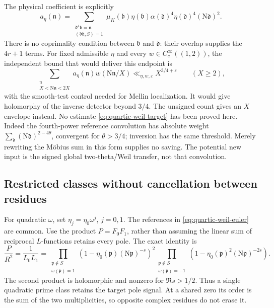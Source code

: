 \documentclass[11pt]{article}
\newcommand{\N}{\mathrm N}
\newcommand{\eps}{\varepsilon}
\begin{document}
The physical coefficient is explicitly
\[
 a_\eta(\mathfrak n)=
 \sum_{\substack{\mathfrak d^4\mathfrak b=\mathfrak n\\
                  (\mathfrak d\mathfrak b,S)=1}}
 \mu_K(\mathfrak b)\eta(\mathfrak b)
 \alpha(\mathfrak d)^4\eta(\mathfrak d)^4(\N\mathfrak d)^2.
\]
There is no coprimality condition between $\mathfrak b$ and
$\mathfrak d$: their overlap supplies the $4r+1$ terms.
For fixed admissible $\eta$ and every $w\in C_c^\infty((1,2))$, the
independent bound that would deliver this endpoint is
\begin{equation}\label{eq:quartic-weil-target}
 \sum_{\substack{\mathfrak n\\X<\N\mathfrak n<2X}}
       a_\eta(\mathfrak n)w(\N\mathfrak n/X)
 \ll_{\eta,w,\eps}X^{3/4+\eps}\qquad(X\ge2),
\end{equation}
with the smooth-test control needed for Mellin localization.
It would give holomorphy of the inverse detector beyond $3/4$.
The unsigned count gives an $X$ envelope instead.
No estimate \eqref{eq:quartic-weil-target} has been proved here.
Indeed the fourth-power reference convolution has absolute weight
$\sum_{\mathfrak d}(\N\mathfrak d)^{2-4\theta}$, convergent for
$\theta>3/4$; inversion has the same threshold. Merely rewriting the
M\"obius sum in this form supplies no saving. The potential new input
is the signed global two-theta/Weil transfer, not that convolution.

\subsection{Restricted classes without cancellation between residues}
For quadratic $\omega$, set $\eta_j=\eta_0\omega^j$, $j=0,1$.
The references in \eqref{eq:quartic-weil-euler} are common. Use the
product $P=F_0F_1$, rather than assuming the linear sum of reciprocal
$L$-functions retains every pole. The exact identity is
\[
 \frac{P}{R^2}=\frac1{L_0L_1}
 =\prod_{\substack{\mathfrak p\notin S\\\omega(\mathfrak p)=1}}
          (1-\eta_0(\mathfrak p)(\N\mathfrak p)^{-s})^2
  \prod_{\substack{\mathfrak p\notin S\\\omega(\mathfrak p)=-1}}
          (1-\eta_0(\mathfrak p)^2(\N\mathfrak p)^{-2s}).
\]
The second product is holomorphic and nonzero for $\Re s>1/2$.
Thus a single quadratic prime class retains the target pole signal.
At a shared zero its order is the sum of the two multiplicities,
so opposite complex residues do not erase it.
\end{document}

